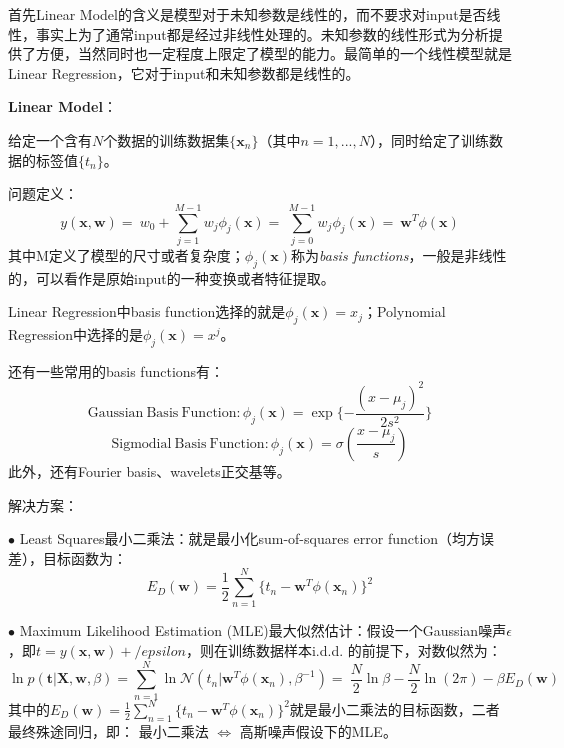 \documentclass[paper=a4,fontsize=11pt]{xetexpNote}
\begin{document}
\sepspace
{}
\sepspace


\begin{compactitem}[\color{RoyalBlue}$\circ$]
	\item 首先Linear Model的含义是模型对于未知参数是线性的，而不要求对input是否线性，事实上为了通常input都是经过非线性处理的。未知参数的线性形式为分析提供了方便，当然同时也一定程度上限定了模型的能力。最简单的一个线性模型就是Linear Regression，它对于input和未知参数都是线性的。
    \item \textbf{Linear Model}：
    
    \qquad 给定一个含有$N$个数据的训练数据集$\{\mathbf{x}_n\}$（其中$n=1,...,N$），同时给定了训练数据的标签值$\{t_n\}$。
    
    \checkmark \textcolor[rgb]{1.00,0.00,0.00}{问题定义}：\[ y(\mathbf{x}, \mathbf{w}) =    \
                                                w_0 + \sum_{j=1}^{M-1} w_j \phi_j(\mathbf{x}) = \
                                                \sum_{j=0}^{M-1} w_j \phi_j(\mathbf{x}) = \                                                
                                                \mathbf{w}^T \phi(\mathbf{x}) \]
    \qquad 其中M定义了模型的尺寸或者复杂度；$\phi_j(\mathbf{x})$称为\emph{basis functions}，一般是非线性的，可以看作是原始input的一种变换或者特征提取。
    
    \qquad Linear Regression中basis function选择的就是$\phi_j(\mathbf{x}) = x_j$；Polynomial Regression中选择的是$\phi_j(\mathbf{x}) = x^j$。
    
    \qquad 还有一些常用的basis functions有：
    \[ \mathrm{Gaussian\ Basis\ Function:} \phi_j(\mathbf{x}) = \exp\{ -\frac{(x-\mu_j)^2}{2s^2} \} \]
    \[ \mathrm{Sigmodial\ Basis\ Function:} \phi_j(\mathbf{x}) = \sigma( \frac{x-\mu_j}{s} ) \]
    此外，还有Fourier basis、wavelets正交基等。
      
    \checkmark \textcolor[rgb]{1.00,0.00,0.00}{解决方案}：   
    
    $\bullet$ Least Squares最小二乘法：就是最小化sum-of-squares error function（均方误差），目标函数为：
    \[ E_D(\mathbf{w}) = \frac{1}{2} \sum_{n=1}^{N}\{t_n - \mathbf{w}^T \phi(\mathbf{x}_n)\} ^ 2 \]
    
    $\bullet$ Maximum Likelihood Estimation (MLE)最大似然估计：假设一个Gaussian噪声$\epsilon$，即$t = y(\mathbf{x}, \mathbf{w}) + /epsilon$，则在训练数据样本i.d.d. 的前提下，对数似然为：
    \[ \ln p(\mathbf{t} | \mathbf{X}, \mathbf{w}, \beta) = \sum_{n=1}^{N} \ln \mathcal{N}( t_n | \mathbf{w}^T \phi(\mathbf{x}_n), \beta^{-1} ) =\
    \frac{N}{2} \ln \beta - \frac{N}{2} \ln (2 \pi) - \beta E_D(\mathbf{w})\]
    其中的$ E_D(\mathbf{w}) = \frac{1}{2} \sum_{n=1}^{N}\{t_n - \mathbf{w}^T \phi(\mathbf{x}_n)\} ^ 2 $就是最小二乘法的目标函数，二者最终殊途同归，即：   
    \textcolor[rgb]{0.00,0.07,1.00}{最小二乘法 $\Longleftrightarrow$ 高斯噪声假设下的MLE}。
    

\end{compactitem}
\end{document}

